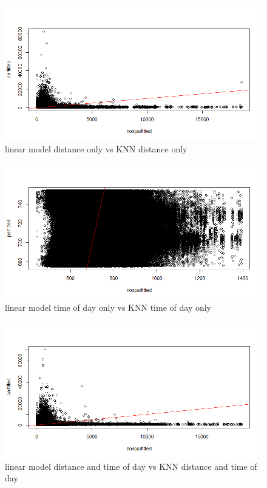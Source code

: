 \documentclass[letterpaper, 12 pt, conference]{article}
\begin{document}
\begin{figure}[H]
    \centering
    \includegraphics[width=12cm]{lindistvsknndist.png}
    \caption{linear model distance only vs KNN distance only}
    \label{fig:b2hist2}
    \end{figure}
\begin{figure}[H]
    \centering
    \includegraphics[width=12cm]{lintimedayvssknntimeday.png}
    \caption{linear model time of day only vs KNN time of day only}
    \label{fig:b2hist2}
    \end{figure}

\begin{figure}[H]
    \centering
    \includegraphics[width=12cm]{lindistimedayvsknndistimeday.png}
    \caption{linear model distance and time of day vs KNN distance and time of day}
    \label{fig:b2hist2}
    \end{figure}
    
\end{document}
